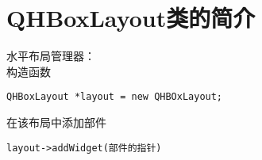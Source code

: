 \chapter{QHBoxLayout类的简介}
\noindent{}水平布局管理器：\\
构造函数
{\color{red}\begin{verbatim}QHBoxLayout *layout = new QHBOxLayout;\end{verbatim}}
\noindent{}在该布局中添加部件
{\color{red}\begin{verbatim}layout->addWidget(部件的指针)\end{verbatim}}
